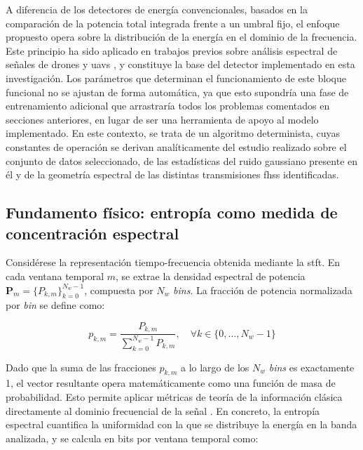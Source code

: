 A diferencia de los detectores de energía convencionales, basados en la comparación de la potencia total integrada frente a un umbral fijo, el enfoque propuesto opera sobre la distribución de la energía en el dominio de la frecuencia. Este principio ha sido aplicado en trabajos previos sobre análisis espectral de señales de drones y \gls{uav}s \cite{morge-rollet_drone_2022, li_dim_2025}, y constituye la base del detector implementado en esta investigación. Los parámetros que determinan el funcionamiento de este bloque funcional no se ajustan de forma automática, ya que esto supondría una fase de entrenamiento adicional que arrastraría todos los problemas comentados en secciones anteriores, en lugar de ser una herramienta de apoyo al modelo implementado. En este contexto, se trata de un algoritmo determinista, cuyas constantes de operación se derivan analíticamente del estudio realizado sobre el conjunto de datos seleccionado, de las estadísticas del ruido gaussiano presente en él y de la geometría espectral de las distintas transmisiones \gls{fhss} identificadas.

\subsection{Fundamento físico: entropía como medida de concentración espectral}
\label{subsec:fundamento_entropia}

Considérese la representación tiempo-frecuencia obtenida mediante la {\gls{stft}}. En cada ventana temporal $m$, se extrae la densidad espectral de potencia $\mathbf{P}_m = \{P_{k,m}\}_{k=0}^{N_w-1}$, compuesta por $N_w$ \textit{bins}. La fracción de potencia normalizada por \textit{bin} se define como:

\begin{equation}
    p_{k,m} = \frac{P_{k,m}}{\displaystyle\sum_{k=0}^{N_w-1} P_{k,m}}, \quad \forall k \in \{0, \ldots, N_w-1\}
    \label{eq:prob_espectral}
\end{equation}

Dado que la suma de las fracciones $p_{k,m}$ a lo largo de los $N_w$ \textit{bins} es exactamente 1, el vector resultante opera matemáticamente como una función de masa de probabilidad. Esto permite aplicar métricas de teoría de la información clásica directamente al dominio frecuencial de la señal \cite{morge-rollet_drone_2022}. En concreto, la entropía espectral cuantifica la uniformidad con la que se distribuye la energía en la banda analizada, y se calcula en bits por ventana temporal como:

